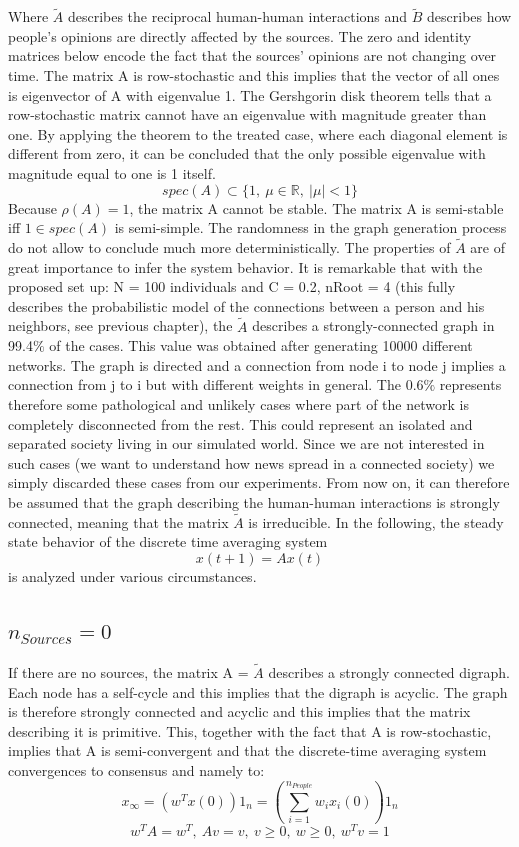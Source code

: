 Where $\tilde{A}$ describes the reciprocal human-human interactions and $\tilde{B}$ describes how people's opinions are directly affected by the sources. The zero and identity matrices below encode the fact that the sources' opinions are not changing over time. \newline
The matrix A is row-stochastic and this implies that the vector of all ones is eigenvector of A with eigenvalue 1. The Gershgorin disk theorem tells that a row-stochastic matrix cannot have an eigenvalue with magnitude greater than one. By applying the theorem to the treated case, where each diagonal element is different from zero, it can be concluded that the only possible eigenvalue with magnitude equal to one is 1 itself. \newline
$$
spec(A) \subset \{1,\ \mu \in \mathbb{R},\ | \mu | < 1\}
$$
Because $\rho(A) = 1$, the matrix A cannot be stable. The matrix A is semi-stable iff $1 \in spec(A)$ is semi-simple. \newline
The randomness in the graph generation process do not allow to conclude much more deterministically. The properties of $\tilde{A}$ are of great importance to infer the system behavior. It is remarkable that with the proposed set up: N = 100 individuals and C = 0.2, nRoot = 4 (this fully describes the probabilistic model of the connections between a person and his neighbors, see previous chapter), the $\tilde{A}$ describes a strongly-connected graph in 99.4$\%$ of the cases. This value was obtained after generating 10000 different networks. The graph is directed and a connection from node i to node j implies a connection from j to i but with different weights in general. The 0.6$\%$ represents therefore some pathological and unlikely cases where part of the network is completely disconnected from the rest. This could represent an isolated and separated society living in our simulated world. Since we are not interested in such cases (we want to understand how news spread in a connected society) we simply discarded these cases from our experiments. From now on, it can therefore be assumed that the graph describing the human-human interactions is strongly connected, meaning that the matrix $\tilde{A}$ is irreducible. In the following, the steady state behavior of the discrete time averaging system 
$$
x(t+1) = Ax(t)
$$
is analyzed under various circumstances.
\subsection{$n_{Sources} = 0$}
If there are no sources, the matrix A = $\tilde{A}$ describes a strongly connected digraph. Each node has a self-cycle and this implies that the digraph is acyclic. The graph is therefore strongly connected and acyclic and this implies that the matrix describing it is primitive. This, together with the fact that A is row-stochastic, implies that A is semi-convergent and that the discrete-time averaging system convergences to consensus and namely to:
$$
x_{\infty} = (w^Tx(0))1_n = (\sum_{i=1}^{n_{People}}w_ix_i(0))1_n
$$
$$
w^TA = w^T,\ 
Av = v,\ 
v \geq 0,\ w \geq 0,\ w^Tv = 1
$$
